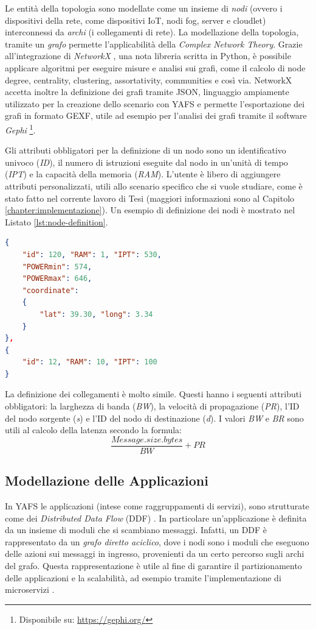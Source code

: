Le entità della topologia sono modellate come un insieme di \textit{nodi} (ovvero i dispositivi della rete, come dispositivi IoT, nodi fog, server e cloudlet) interconnessi da \textit{archi} (i collegamenti di rete). La modellazione della topologia, tramite un \textit{grafo} permette l'applicabilità della \textit{Complex Network Theory}. Grazie all'integrazione di \textit{NetworkX}  \cite{NetworkX}, una nota libreria scritta in Python, è possibile applicare algoritmi per eseguire misure e analisi sui grafi, come il calcolo di node degree, centrality, clustering, assortativity, communities e così via. NetworkX accetta inoltre la definizione dei grafi tramite JSON, linguaggio ampiamente utilizzato per la creazione dello scenario con YAFS e permette l'esportazione dei grafi in formato GEXF, utile ad esempio per l'analisi dei grafi tramite il software \textit{Gephi} \footnote{Disponibile su: \url{https://gephi.org/}}.

Gli attributi obbligatori per la definizione di un nodo sono un identificativo univoco (\textit{ID}), il numero di istruzioni eseguite dal nodo in un'unità di tempo (\textit{IPT}) e la capacità della memoria (\textit{RAM}). L'utente è libero di aggiungere attributi personalizzati, utili allo scenario specifico che si vuole studiare, come è stato fatto nel corrente lavoro di Tesi (maggiori informazioni sono al Capitolo \ref{chapter:implementazione}). Un esempio di definizione dei nodi è mostrato nel Listato \ref{lst:node-definition}. 
\begin{lstlisting}[language=json, caption={Definizione di due nodi Fog utilizzando la rappresentazione JSON \cite{YAFSSimulator}}, captionpos=b, label={lst:node-definition}]
{
	"id": 120, "RAM": 1, "IPT": 530,
	"POWERmin": 574,
	"POWERmax": 646,
	"coordinate": 
	{
		"lat": 39.30, "long": 3.34
	}
},
{
	"id": 12, "RAM": 10, "IPT": 100
}
\end{lstlisting}

La definizione dei collegamenti è molto simile. Questi hanno i seguenti attributi obbligatori: la larghezza di banda (\textit{BW}), la velocità di propagazione (\textit{PR}), l'ID del nodo sorgente (\textit{s}) e l'ID del nodo di destinazione (\textit{d}). I valori \textit{BW} e \textit{BR} sono utili al calcolo della latenza secondo la formula:
$$\frac{Message.size.bytes}{BW} + PR$$

\subsection{Modellazione delle Applicazioni}
In YAFS le applicazioni (intese come raggruppamenti di servizi), sono strutturate come dei \textit{Distributed Data Flow} (DDF) \cite{DDF_IOT_App}. In particolare un'applicazione è definita da un insieme di moduli che si scambiano messaggi. Infatti, un DDF è rappresentato da un \textit{grafo diretto aciclico}, dove i nodi sono i moduli che eseguono delle azioni sui messaggi in ingresso, provenienti da un certo percorso sugli archi del grafo. Questa rappresentazione è utile al fine di garantire il partizionamento delle applicazioni e la scalabilità, ad esempio tramite l'implementazione di microservizi \cite{microservices}. 

